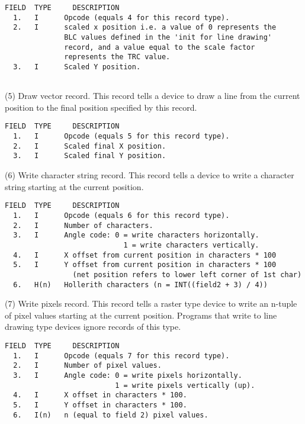 \begin{verbatim}
FIELD  TYPE     DESCRIPTION
  1.   I      Opcode (equals 4 for this record type).
  2.   I      scaled x position i.e. a value of 0 represents the
              BLC values defined in the 'init for line drawing'
              record, and a value equal to the scale factor
              represents the TRC value.
  3.   I      Scaled Y position.
 
\end{verbatim}

 
(5)  Draw vector record.
    This record tells a device to draw a line from the current
position to the final position specified by this record.
 
\begin{verbatim}
FIELD  TYPE     DESCRIPTION
  1.   I      Opcode (equals 5 for this record type).
  2.   I      Scaled final X position.
  3.   I      Scaled final Y position.
\end{verbatim}

 
 
(6) Write character string record.  This record tells a device to
write a character string starting at the current position.
 
\begin{verbatim}
FIELD  TYPE     DESCRIPTION
  1.   I      Opcode (equals 6 for this record type).
  2.   I      Number of characters.
  3.   I      Angle code: 0 = write characters horizontally.
                            1 = write characters vertically.
  4.   I      X offset from current position in characters * 100
  5.   I      Y offset from current position in characters * 100
                (net position refers to lower left corner of 1st char)
  6.   H(n)   Hollerith characters (n = INT((field2 + 3) / 4))
\end{verbatim}

 
 
(7)  Write pixels record.
    This record tells a raster type device to write an n-tuple of
pixel values starting at the current position.  Programs that write
to line drawing type devices ignore records of this type.
 
\begin{verbatim}
FIELD  TYPE     DESCRIPTION
  1.   I      Opcode (equals 7 for this record type).
  2.   I      Number of pixel values.
  3.   I      Angle code: 0 = write pixels horizontally.
                          1 = write pixels vertically (up).
  4.   I      X offset in characters * 100.
  5.   I      Y offset in characters * 100.
  6.   I(n)   n (equal to field 2) pixel values.
\end{verbatim}
 
